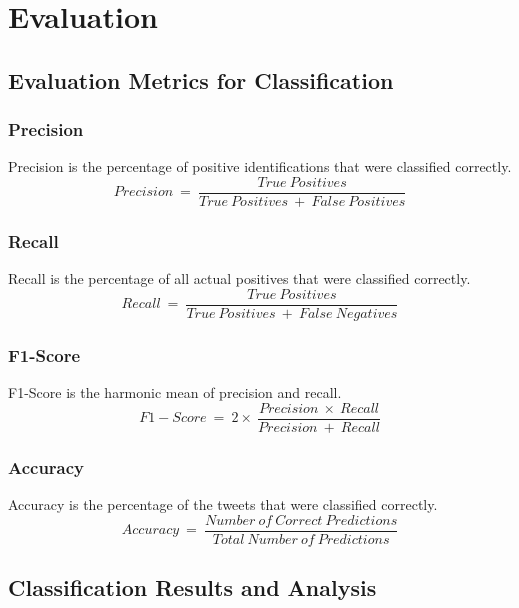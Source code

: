 \section{Evaluation}

\subsection{Evaluation Metrics for Classification}

\subsubsection{Precision}
Precision is the percentage of positive identifications that were classified correctly.\newline
\begin{equation}
    Precision\ =\ \frac{True\ Positives}{True\ Positives\ +\ False\ Positives}
\end{equation}

\subsubsection{Recall}
Recall is the percentage of all actual positives that were classified correctly.
\begin{equation}
    Recall\ =\ \frac{True\ Positives}{True\ Positives\ +\ False\ Negatives}
\end{equation}

\subsubsection{F1-Score}
F1-Score is the harmonic mean of precision and recall.
\begin{equation}
    F1-Score\ =\ 2 \times\ \frac{Precision\ \times\ Recall}{Precision\ +\ Recall}
\end{equation}

\subsubsection{Accuracy}
Accuracy is the percentage of the tweets that were classified correctly.
\begin{equation}
    Accuracy\ =\ \frac{Number\ of\ Correct\ Predictions}{Total\ Number\ of\ Predictions}
\end{equation}

\subsection{Classification Results and Analysis}

